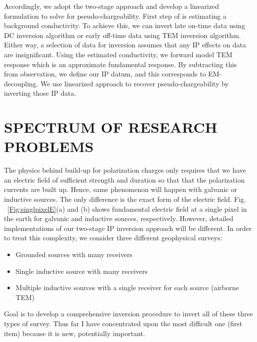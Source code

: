 \documentclass[letterpaper,11pt]{article}
\begin{document}


Accordingly, we adopt the two-stage approach and develop a linearized formulation to solve for pseudo-chargeability. First step of is estimating a background conductivity. To achieve this, we can invert late on-time data using DC inversion algorithm or early off-time data using TEM inversion algorithm. Either way, a selection of data for inversion assumes that any IP effects on data are insignificant. Using the estimated conductivity, we forward model TEM response which is an approximate fundamental response. By subtracting this from observation, we define our IP datum, and this corresponds to EM-decoupling. We use linearized approach to recover pseudo-chargeability by inverting those IP data. 

\section{SPECTRUM OF RESEARCH PROBLEMS}
The physics behind build-up for polarization charges only requires that we have an electric field of sufficient strength and duration so that that the polarization currents are built up. Hence, same phenomenon will happen with galvanic or inductive sources. The only difference is the exact form of the electric field. Fig. ~\ref{Fig:singlpixelE}(a) and (b) shows fundamental electric field at a single pixel in the earth for galvanic and inductive sources, respectively. However, detailed implementations of our two-stage IP inversion approach will be different. In order to treat this complexity, we consider three different geophysical surveys:
\begin{itemize}
  \item Grounded sources with many receivers
  \item Single inductive source with many receivers
  \item Multiple inductive sources with a single receiver for each source (airborne TEM)
\end{itemize}

Goal is to develop a comprehensive inversion procedure to invert all of these three types of survey. Thus far I have concentrated upon the most difficult one (first item) because it is new, potentially important. 
\end{document}

